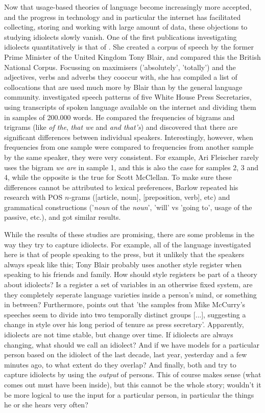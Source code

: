\documentclass[12pt]{article}
\begin{document}
Now that usage-based theories of language become increasingly more accepted, and the progress in technology and in particular the internet has facilitated collecting, storing and working with large amount of data, these objections to studying idiolects slowly vanish. One of the first publications investigating idiolects quantitatively is that of . She created a corpus of speech by the former Prime Minister of the United Kingdom Tony Blair, and compared this the British National Corpus. Focussing on maximisers ('absolutely', 'totally') and the adjectives, verbs and adverbs they cooccur with, she has compiled a list of collocations that are used much more by Blair than by the general language community.  investigated speech patterns of five White House Press Secretaries, using transcripts of spoken language available on the internet and dividing them in samples of 200.000 words. He compared the frequencies of bigrams and trigrams (like \emph{of the}, \emph{that we} and \emph{and that's}) and discovered that there are significant differences between individual speakers. Interestingly, however, when frequencies from one sample were compared to frequencies from another sample by the same speaker, they were very consistent. For example, Ari Fleischer rarely uses the bigram \emph{we are} in sample 1, and this is also the case for samples 2, 3 and 4, while the opposite is the true for Scott McClellan. To make sure these differences cannot be attributed to lexical preferences, Barlow repeated his research with POS $n$-grams ([article, noun], [preposition, verb], etc) and 
grammatical constructions ('\emph{noun} of the \emph{noun}',  'will' vs 'going to', usage of the passive, etc.), and got similar results.

While the results of these studies are promising, there are some problems in the way they try to capture idiolects. For example, all of the language investigated here is that of people speaking to the press, but it unlikely that the speakers always speak like this; Tony Blair probably uses another style register when speaking to his friends and family. How should style registers be part of a theory about idiolects? Is a register a set of variables in an otherwise fixed system, are they completely seperate language varieties inside a person's mind, or something in between? Furthermore,  points out that 'the samples from Mike McCurry's speeches seem to divide into two temporally distinct groups [...], suggesting a change in style over his long period of tenure as press secretary'. Apparently, idiolects are not time stable, but change over time. If idiolects are always changing, what should we call an idiolect? And if we have models for a particular person based on the idiolect of the last decade, last year, yesterday and a few minutes ago, to what extent do they overlap? And finally, both  and  try to capture idiolects by using the \emph{output} of persons. This of course makes sense (what comes out must have been inside), but this cannot be the whole story; wouldn't it be more logical to use the input for a particular person, in particular the things he or she hears very often?
\end{document}
